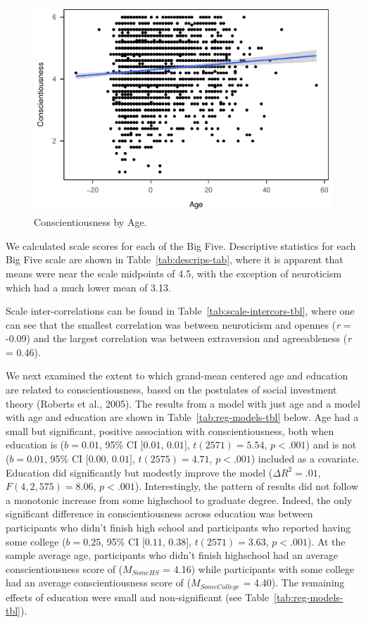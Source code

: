 \documentclass[
  english,
  man,floatsintext]{apa6}
\begin{document}
\begin{figure}
\centering
\includegraphics{papaja_example_ms_files/figure-latex/fig-ageXconsc-1.pdf}
\caption{\label{fig:fig-ageXconsc}Conscientiousness by Age.}
\end{figure}

We calculated scale scores for each of the Big Five. Descriptive statistics for each Big Five scale are shown in Table~\ref{tab:descrips-tab}, where it is apparent that means were near the scale midpoints of 4.5, with the exception of neuroticism which had a much lower mean of 3.13.

Scale inter-correlations can be found in Table~\ref{tab:scale-intercors-tbl}, where one can see that the smallest correlation was between neuroticism and opennes (\emph{r} = -0.09) and the largest correlation was between extraversion and agreeableness (\emph{r} = 0.46).

We next examined the extent to which grand-mean centered age and education are related to conscientiousness, based on the postulates of social investment theory (Roberts et al., 2005). The results from a model with just age and a model with age and education are shown in Table~\ref{tab:reg-models-tbl} below. Age had a small but significant, positive association with conscientiousness, both when education is (\(b = 0.01\), 95\% CI \([0.01\), \(0.01]\), \(t(2571) = 5.54\), \(p < .001\)) and is not (\(b = 0.01\), 95\% CI \([0.00\), \(0.01]\), \(t(2575) = 4.71\), \(p < .001\)) included as a covariate. Education did significantly but modestly improve the model (\(\Delta R^2 = .01\), \(F(4, 2,575) = 8.06\), \(p < .001\)). Interestingly, the pattern of results did not follow a monotonic increase from some highschool to graduate degree. Indeed, the only significant difference in conscientiousness across education was between participants who didn't finish high school and participants who reported having some college (\(b = 0.25\), 95\% CI \([0.11\), \(0.38]\), \(t(2571) = 3.63\), \(p < .001\)). At the sample average age, participants who didn't finish highschool had an average conscientiousness score of (\(M_{SomeHS}\) = 4.16) while participants with some college had an average conscientiousness score of (\(M_{SomeCollege}\) = 4.40). The remaining effects of education were small and non-significant (see Table~\ref{tab:reg-models-tbl}).
\end{document}
